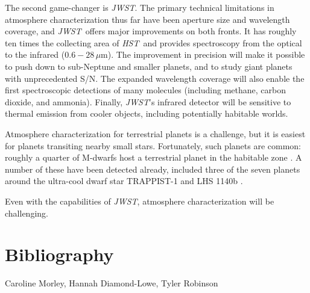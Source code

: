 \documentclass[graybox,natbib,nosecnum]{svmult}
\newcommand{\project}[1]{\textsl{#1}}
\newcommand{\JWST}{\project{JWST}}
\newcommand{\HST}{\project{HST}}
\begin{document}
The second game-changer is \JWST. The primary technical limitations in atmosphere characterization thus far have been aperture size and wavelength coverage, and \JWST\ offers major improvements on both fronts. It has roughly ten times the collecting area of \HST\, and provides spectroscopy from the optical to the infrared ($0.6 - 28\,\mu$m). The improvement in precision will make it possible to push down to sub-Neptune and smaller planets, and to study giant planets with unprecedented S/N. The expanded wavelength coverage will also enable the first spectroscopic detections of many molecules (including methane, carbon dioxide, and ammonia). Finally, \JWST's infrared detector will be sensitive to thermal emission from cooler objects, including potentially habitable worlds.

Atmosphere characterization for terrestrial planets is a challenge, but it is easiest for planets transiting nearby small stars.  Fortunately, such planets are common: roughly a quarter of M-dwarfs host a terrestrial planet in the habitable zone \citep{dressing15}. A number of these have been detected already, included three of the seven planets around the ultra-cool dwarf star TRAPPIST-1 and LHS 1140b \citep{gillon17, dittman17}.

Even with the capabilities of \JWST, atmosphere characterization will be challenging.

\section{Bibliography}

\begin{acknowledgement}
Caroline Morley, Hannah Diamond-Lowe, Tyler Robinson
\end{acknowledgement}

\end{document}
